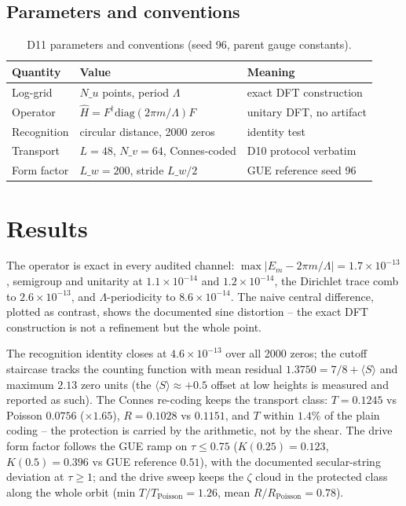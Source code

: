 \documentclass[11pt,a4paper]{article}
\begin{document}
\subsection{Parameters and conventions}
\begin{table}[htbp]\centering\small
\begin{tabularx}{\columnwidth}{@{}l l X@{}}
\toprule
Quantity & Value & Meaning \\
\midrule
Log-grid & $N\_u$ points, period $\Lambda$ & exact DFT construction \\
Operator & $\hat{H} = F^\dagger\mathrm{diag}(2\pi m/\Lambda)F$ & unitary DFT, no artifact \\
Recognition & circular distance, 2000 zeros & identity test \\
Transport & $L = 48$, $N\_v = 64$, Connes-coded & D10 protocol verbatim \\
Form factor & $L\_w = 200$, stride $L\_w/2$ & GUE reference seed 96 \\
\bottomrule
\end{tabularx}
\caption{D11 parameters and conventions (seed 96, parent gauge constants).}
\end{table}

\section{Results}
The operator is exact in every audited channel: $\max|E_m - 2\pi m/\Lambda| = 1.7\times10^{-13}$, semigroup and unitarity at $1.1\times10^{-14}$ and $1.2\times10^{-14}$, the Dirichlet trace comb to $2.6\times10^{-13}$, and $\Lambda$-periodicity to $8.6\times10^{-14}$. The naive central difference, plotted as contrast, shows the documented sine distortion -- the exact DFT construction is not a refinement but the whole point.

The recognition identity closes at $4.6\times10^{-13}$ over all 2000 zeros; the cutoff staircase tracks the counting function with mean residual $1.3750 = 7/8 + \langle S\rangle$ and maximum $2.13$ zero units (the $\langle S\rangle \approx +0.5$ offset at low heights is measured and reported as such). The Connes re-coding keeps the transport class: $T = 0.1245$ vs Poisson $0.0756$ ($\times 1.65$), $R = 0.1028$ vs $0.1151$, and $T$ within $1.4\%$ of the plain coding -- the protection is carried by the arithmetic, not by the shear. The drive form factor follows the GUE ramp on $\tau \le 0.75$ ($K(0.25) = 0.123$, $K(0.5) = 0.396$ vs GUE reference $0.51$), with the documented secular-string deviation at $\tau \ge 1$; and the drive sweep keeps the $\zeta$ cloud in the protected class along the whole orbit (min $T/T_{\mathrm{Poisson}} = 1.26$, mean $R/R_{\mathrm{Poisson}} = 0.78$).
\end{document}
